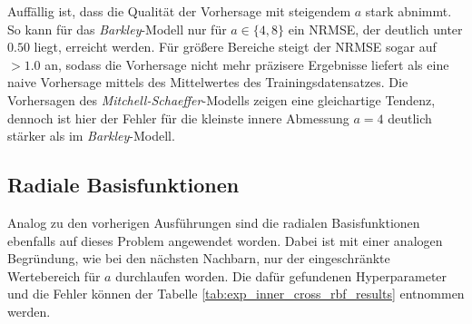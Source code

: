 Auffällig ist, dass die Qualität der Vorhersage mit steigendem $a$ stark abnimmt. So kann für das \textit{Barkley}-Modell nur für $a \in \{4,8\}$ ein NRMSE, der deutlich unter $0.50$ liegt, erreicht werden. Für größere Bereiche steigt der NRMSE sogar auf $> 1.0$ an, sodass die Vorhersage nicht mehr präzisere Ergebnisse liefert als eine naive Vorhersage mittels des Mittelwertes des Trainingsdatensatzes. Die Vorhersagen des \textit{Mitchell-Schaeffer}-Modells zeigen eine gleichartige Tendenz, dennoch ist hier der Fehler für die kleinste innere Abmessung $a=4$ deutlich stärker als im \textit{Barkley}-Modell.

\FloatBarrier
\subsection{Radiale Basisfunktionen}
Analog zu den vorherigen Ausführungen sind die radialen Basisfunktionen ebenfalls auf dieses Problem angewendet worden. Dabei ist mit einer analogen Begründung, wie bei den nächsten Nachbarn, nur der eingeschränkte Wertebereich für $a$ durchlaufen worden. Die dafür gefundenen Hyperparameter und die Fehler können der Tabelle \ref{tab:exp_inner_cross_rbf_results} entnommen werden.

